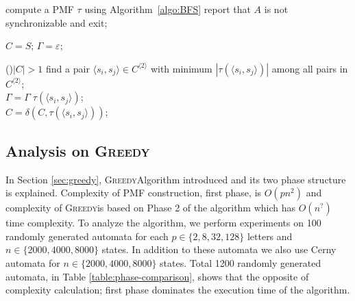 \documentclass[12pt]{article}
\newcommand{\comment}[2]{{\color{red}{\bf (#1: #2)}}}
\newcommand{\greedyAlgo}{\textsc{Greedy}}
\begin{document}
\comment{sertac}{complexity $O(n^3)$ mu demeliyiz yoksa $O(n^4)$ mu? interediate phaseden bahsetmeli miyiz?}

\begin{algorithm}[ht]
	\label{algo:greedy}
	\caption{Eppstein's \textsc{Greedy} Algorithm}
	
	
	compute a PMF $\tau$ using Algorithm~\ref{algo:BFS}\;
	{
		report that $A$ is not synchronizable and exit;	
	}

	
	$C = S$; 
	$\Gamma = \varepsilon$; 
	
	\While(){$|C| > 1$}
	{
		find a pair $\langle s_i,s_j \rangle \in C^{\langle 2 \rangle}$ 
		with minimum $|\tau(\langle s_i,s_j \rangle)|$ among all pairs 
		in $C^{\langle 2 \rangle}$;\\
		
		
		$\Gamma = \Gamma \; \tau(\langle s_i,s_j \rangle)$;\\
		$C = \delta(C,\tau(\langle s_i,s_j \rangle))$;
	}
\end{algorithm}


\subsection{Analysis on \greedyAlgo}
\label{sec:greedy-analysis}


In Section \ref{sec:greedy}, \greedyAlgo \space Algorithm introduced and its two phase structure is explained. Complexity of PMF construction, first phase, is $O(pn^2)$ and complexity of \greedyAlgo \space is based on Phase 2 of the algorithm which has $O(n^?)$ time complexity. To analyze the algorithm, we perform experiments on 100 randomly generated automata for each  $p \in \{2, 8, 32, 128\}$ letters and  $n \in \{2000, 4000, 8000\}$ states. In addition to these automata we also use Cerny automata \cite{cerny} for $n \in \{2000, 4000, 8000\}$ states. Total 1200 randomly generated automata, in Table \ref{table:phase-comparison}, shows that the opposite of complexity calculation; first phase dominates the execution time of the algorithm.
\end{document}
